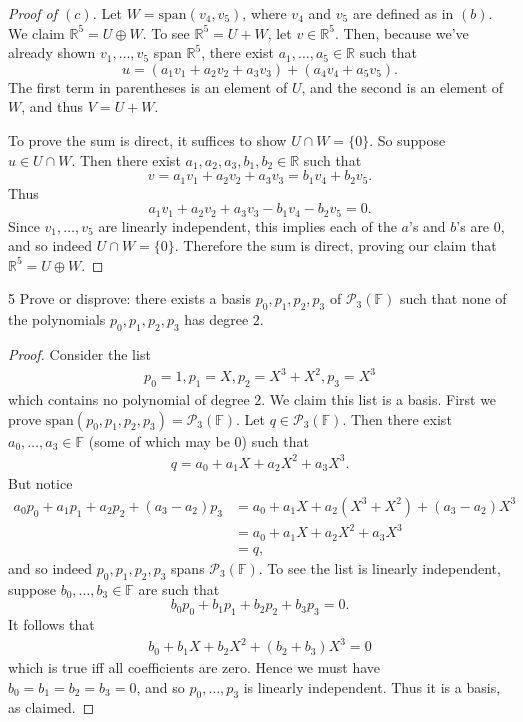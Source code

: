 \documentclass{extarticle}
\newenvironment{problem}[1]{\begin{prob*}{#1}{}}{\end{prob*}}
\newcommand{\R}{\mathbb{R}}
\newcommand{\F}{\mathbb{F}}
\newcommand{\Span}{\mathrm{span}}
\begin{document}
\begin{proof}[Proof of $(c)$]
Let $W = \Span(v_4, v_5)$, where $v_4$ and $v_5$ are defined as in $(b)$.  We claim $\R^5 = U\oplus W$.  To see $\R^5 = U + W$, let $v\in\R^5$.  Then, because we've already shown $v_1,\dots, v_5$ span $\R^5$, there exist $a_1,\dots, a_5\in\R$ such that 
\begin{equation*}
u = (a_1v_1 + a_2v_2 + a_3v_3) + (a_4v_4 + a_5v_5).
\end{equation*}
The first term in parentheses is an element of $U$, and the second is an element of $W$, and thus $V=U+W$.
\par To prove the sum is direct, it suffices to show $U\cap W = \{0\}$.  So suppose $u\in U\cap W$.  Then there exist $a_1,a_2,a_3,b_1,b_2\in\R$ such that 
\begin{equation*}
v = a_1v_1 + a_2v_2 + a_3v_3 = b_1v_4 + b_2v_5.
\end{equation*}
Thus
\begin{equation*}
a_1v_1 + a_2v_2 + a_3v_3 - b_1v_4 - b_2v_5 = 0.
\end{equation*}
Since $v_1,\dots,v_5$ are linearly independent, this implies each of the $a$'s and $b$'s are $0$, and so indeed $U\cap W = \{0\}$.  Therefore the sum is direct, proving our claim that $\R^5 = U\oplus W$.
\end{proof}

\begin{problem}{5}
Prove or disprove: there exists a basis $p_0, p_1,p_2,p_3$ of $\mathcal{P}_3(\F)$ such that none of the polynomials $p_0,p_1,p_2,p_3$ has degree $2$.
\end{problem}
\begin{proof}
Consider the list
\begin{align*}
p_0 = 1, p_1 = X, p_2 = X^3 + X^2, p_3 = X^3
\end{align*}
which contains no polynomial of degree $2$.  We claim this list is a basis.  First we prove $\Span(p_0, p_1,p_2,p_3) = \mathcal{P}_3(\F)$.  Let $q\in\mathcal{P}_3(\F)$.  Then there exist $a_0,\dots, a_3\in\F$ (some of which may be $0$) such that
\begin{align*}
q = a_0 + a_1X + a_2X^2 + a_3X^3.
\end{align*}
But notice
\begin{align*}
a_0p_0 + a_1p_1 + a_2p_2 + (a_3-a_2)p_3  &= a_0 + a_1X + a_2(X^3 + X^2) + (a_3-a_2)X^3\\
&= a_0 + a_1X + a_2X^2 + a_3X^3\\
&= q,
\end{align*}
and so indeed $p_0,p_1,p_2,p_3$ spans $\mathcal{P}_3(\F)$.  To see the list is linearly independent, suppose $b_0,\dots,b_3\in\F$ are such that
\begin{equation*}
b_0p_0 + b_1p_1 + b_2p_2 + b_3p_3 = 0.
\end{equation*}
It follows that
\begin{align*}
b_0 + b_1X + b_2X^2 + (b_2 + b_3)X^3 = 0 
\end{align*}
which is true iff all coefficients are zero.  Hence we must have $b_0=b_1=b_2=b_3=0$, and so $p_0,\dots,p_3$ is linearly independent.  Thus it is a basis, as claimed.
\end{proof}
\end{document}
